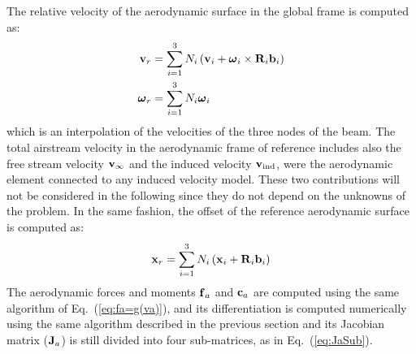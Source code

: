 The relative velocity of the aerodynamic surface in the global
frame is computed as:
\begin{align}
	\bm{\mathbf{v}}_r &= \sum_{i=1}^3 N_i \left( \bm{\mathbf{v}}_i 
		+ \bm{\mathbf{\omega}}_i\times\bm{\mathbf{R}}_i\bm{\mathbf{b}}_i \right)\\
	\bm{\mathbf{\omega}}_r &= \sum_{i=1}^3 N_i \bm{\mathbf{\omega}}_i 
\end{align}
which is an interpolation of the velocities of the three nodes
of the beam.  
The total airstream velocity in the aerodynamic frame of reference 
includes also the free stream velocity $\bm{\mathbf{v}}_{\infty}$ and
the induced velocity $\bm{\mathbf{v}}_{\text{ind}}$, were the aerodynamic element
connected to any induced velocity model.
These two contributions will not be considered in the following
since they do not depend on the unknowns of the problem.  
In the same fashion, the offset of the reference 
aerodynamic surface is computed as:
\begin{equation}
	\bm{\mathbf{x}}_r = \sum_{i=1}^3 N_i \left( \bm{\mathbf{x}}_i 
		+ \bm{\mathbf{R}}_i\bm{\mathbf{b}}_i \right)
\end{equation}
The aerodynamic forces and moments $\bm{\mathbf{f}}_a$ and $\bm{\mathbf{c}}_a$
are computed using the same algorithm of Eq.~(\ref{eq:fa=g(va)}), 
and its differentiation is computed numerically using the same 
algorithm described in the previous section and its Jacobian matrix
($\bm{\mathbf{J}}_{a}$) is still divided into four sub-matrices, as in 
Eq.~(\ref{eq:JaSub}).

